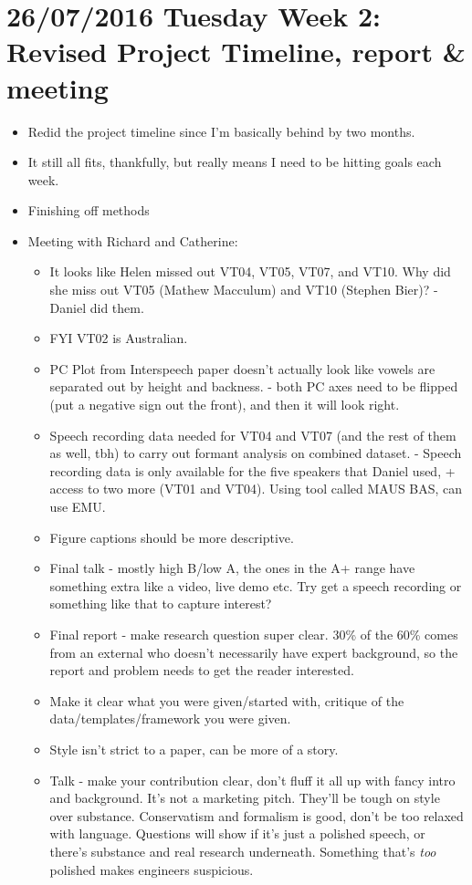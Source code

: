 \documentclass{article}
\begin{document}
\section*{26/07/2016 Tuesday Week 2: Revised Project Timeline, report \& meeting}
\begin{itemize}
    \item Redid the project timeline since I'm basically behind by two months.
    \item It still all fits, thankfully, but really means I need to be hitting goals each week.
    \item Finishing off methods
    \item Meeting with Richard and Catherine:
    \begin{itemize}
        \item It looks like Helen missed out VT04, VT05, VT07, and VT10. Why did she miss out VT05 (Mathew Macculum) and VT10 (Stephen Bier)? - Daniel did them.
        \item FYI VT02 is Australian.
        \item PC Plot from Interspeech paper doesn't actually look like vowels are separated out by height and backness. - both PC axes need to be flipped (put a negative sign out the front), and then it will look right.
        \item Speech recording data needed for VT04 and VT07 (and the rest of them as well, tbh) to carry out formant analysis on combined dataset. - Speech recording data is only available for the five speakers that Daniel used, + access to two more (VT01 and VT04). Using tool called MAUS BAS, can use EMU.
        \item Figure captions should be more descriptive.
        \item Final talk - mostly high B/low A, the ones in the A+ range have something extra like a video, live demo etc. Try get a speech recording or something like that to capture interest?
        \item Final report - make research question super clear. 30\% of the 60\% comes from an external who doesn't necessarily have expert background, so the report and problem needs to get the reader interested.
        \item Make it clear what you were given/started with, critique of the data/templates/framework you were given.
        \item Style isn't strict to a paper, can be more of a story.
        \item Talk - make your contribution clear, don't fluff it all up with fancy intro and background. It's not a marketing pitch. They'll be tough on style over substance. Conservatism and formalism is good, don't be too relaxed with language. Questions will show if it's just a polished speech, or there's substance and real research underneath. Something that's \textit{too} polished makes engineers suspicious.
    \end{itemize}
\end{itemize}
\end{document}

